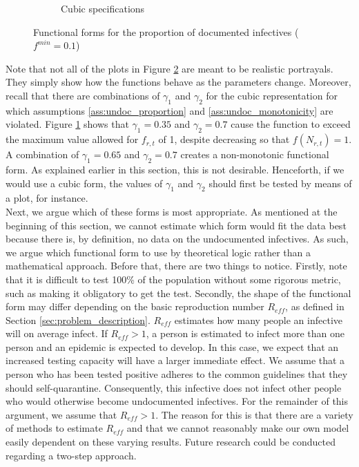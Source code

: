 \documentclass[12pt]{article}
\begin{document}
\begin{figure}[ht]
{\begin{subfigure}[pt]{0.48\linewidth}
	    \caption{Cubic specifications}
	    \label{fig:functional_forms_cubic}
	\end{subfigure}
    }
    
    \caption{Functional forms for the proportion of documented infectives ($f^{min} = 0.1$)}
    \label{fig:functional_forms}
    \end{figure}
    
    Note that not all of the plots in Figure \ref{fig:functional_forms} are meant to be realistic portrayals. They simply show how the functions behave as the parameters change. Moreover, recall that there are combinations of $\gamma_1$ and $\gamma_2$ for the cubic representation for which assumptions \ref{ass:undoc_proportion} and \ref{ass:undoc_monotonicity} are violated. Figure \ref{fig:functional_forms_cubic} shows that $\gamma_1=0.35$ and $\gamma_2=0.7$ cause the function to exceed the maximum value allowed for $f_{r,t}$ of 1, despite decreasing so that $f(N_{r,t}) = 1$. A combination of $\gamma_1=0.65$ and $\gamma_2=0.7$ creates a non-monotonic functional form. As explained earlier in this section, this is not desirable. Henceforth, if we would use a cubic form, the values of $\gamma_1$ and $\gamma_2$ should first be tested by means of a plot, for instance. \\
    
    Next, we argue which of these forms is most appropriate. As mentioned at the beginning of this section, we cannot estimate which form would fit the data best because there is, by definition, no data on the undocumented infectives. As such, we argue which functional form to use by theoretical logic rather than a mathematical approach. Before that, there are two things to notice. Firstly, note that it is difficult to test 100\% of the population without some rigorous metric, such as making it obligatory to get the test. Secondly, the shape of the functional form may differ depending on the basic reproduction number $R_{eff}$, as defined in Section \ref{sec:problem_description}. $R_{eff}$ estimates how many people an infective will on average infect. If $R_{eff} > 1$, a person is estimated to infect more than one person and an epidemic is expected to develop. In this case, we expect that an increased testing capacity will have a larger immediate effect. We assume that a person who has been tested positive adheres to the common guidelines that they should self-quarantine. Consequently, this infective does not infect other people who would otherwise become undocumented infectives. For the remainder of this argument, we assume that $R_{eff} > 1$. The reason for this is that there are a variety of methods to estimate $R_{eff}$ and that we cannot reasonably make our own model easily dependent on these varying results. Future research could be conducted regarding a two-step approach. \\
    
\end{document}
